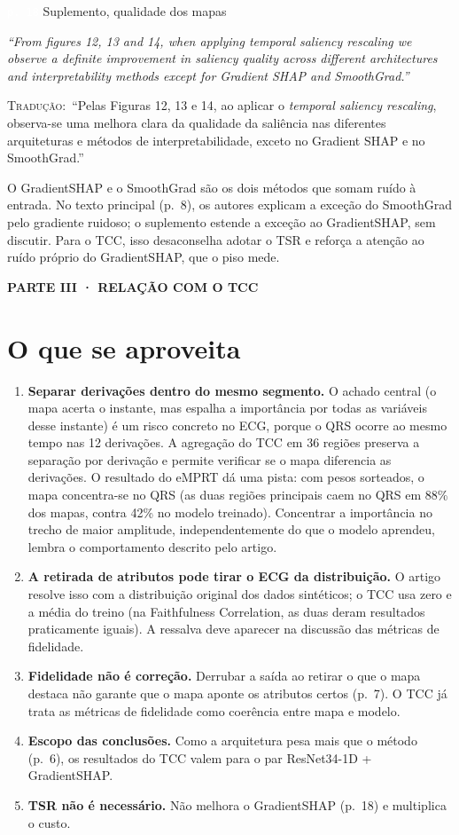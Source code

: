 \documentclass[11pt,a4paper]{article}
\newcommand{\pagechip}[1]{{\setlength{\fboxsep}{1.5pt}\colorbox{cAcc}{\textcolor{white}{\scriptsize\texttt{#1}}}}}
\newcommand{\partbar}[1]{\par\vspace{1.2em}\noindent\colorbox{black!80}{\parbox{\dimexpr\linewidth-2\fboxsep}{\color{white}\bfseries\sffamily\MakeUppercase{#1}}}\par\vspace{0.4em}}
\newenvironment{origquote}{\par\itshape\small}{\par}
\newenvironment{tradquote}{\par\small\textsc{Tradução:}\ }{\par}
\newcommand{\explab}[1]{\par\smallskip{\small\color{cAcc}\textbf{\MakeUppercase{#1}}}\par}
\begin{document}
\begin{citacard}{\pagechip{p. 18} Suplemento, qualidade dos mapas}
\begin{origquote}“From figures 12, 13 and 14, when applying temporal saliency rescaling we observe a definite improvement in saliency quality across different architectures and interpretability methods except for Gradient SHAP and SmoothGrad.”\end{origquote}
\begin{tradquote}“Pelas Figuras 12, 13 e 14, ao aplicar o \textit{temporal saliency rescaling}, observa-se uma melhora clara da qualidade da saliência nas diferentes arquiteturas e métodos de interpretabilidade, exceto no Gradient SHAP e no SmoothGrad.”\end{tradquote}
\explab{Explicação}
O GradientSHAP e o SmoothGrad são os dois métodos que somam ruído à entrada. No texto principal (p.~8), os autores explicam a exceção do SmoothGrad pelo gradiente ruidoso; o suplemento estende a exceção ao GradientSHAP, sem discutir. Para o TCC, isso desaconselha adotar o TSR e reforça a atenção ao ruído próprio do GradientSHAP, que o piso mede.
\end{citacard}

\partbar{Parte III · Relação com o TCC}

\section{O que se aproveita}
\begin{enumerate}
\item \textbf{Separar derivações dentro do mesmo segmento.} O achado central (o mapa acerta o instante, mas espalha a importância por todas as variáveis desse instante) é um risco concreto no ECG, porque o QRS ocorre ao mesmo tempo nas 12 derivações. A agregação do TCC em 36 regiões preserva a separação por derivação e permite verificar se o mapa diferencia as derivações. O resultado do eMPRT dá uma pista: com pesos sorteados, o mapa concentra-se no QRS (as duas regiões principais caem no QRS em 88\% dos mapas, contra 42\% no modelo treinado). Concentrar a importância no trecho de maior amplitude, independentemente do que o modelo aprendeu, lembra o comportamento descrito pelo artigo.
\item \textbf{A retirada de atributos pode tirar o ECG da distribuição.} O artigo resolve isso com a distribuição original dos dados sintéticos; o TCC usa zero e a média do treino (na Faithfulness Correlation, as duas deram resultados praticamente iguais). A ressalva deve aparecer na discussão das métricas de fidelidade.
\item \textbf{Fidelidade não é correção.} Derrubar a saída ao retirar o que o mapa destaca não garante que o mapa aponte os atributos certos (p.~7). O TCC já trata as métricas de fidelidade como coerência entre mapa e modelo.
\item \textbf{Escopo das conclusões.} Como a arquitetura pesa mais que o método (p.~6), os resultados do TCC valem para o par ResNet34-1D + GradientSHAP.
\item \textbf{TSR não é necessário.} Não melhora o GradientSHAP (p.~18) e multiplica o custo.
\end{enumerate}
\end{document}
